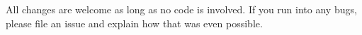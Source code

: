 All changes are welcome as long as no code is involved. If you run into any bugs, please file an issue and explain how that was even possible. 